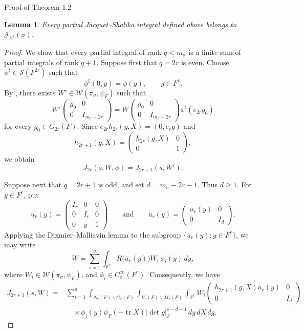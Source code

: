 \documentclass[12pt,reqno]{amsart}
\numberwithin{equation}{section}%
\numberwithin{equation}{subsection}
\newtheorem{lemma}[equation]{Lemma}
\theoremstyle{definition}
\theoremstyle{remark}
\begin{document}
\begin{section}{Proof of Theorem 1.2}
\begin{lemma}
\label{lem:partial-jacquet-shalika-integrals}
Every partial Jacquet--Shalika integral defined above belongs to $\mathcal{J}_{\wedge^2}(\sigma)$.
\end{lemma}

\begin{proof}
We show that every partial integral of rank $q<m_\sigma$ is a finite sum of partial integrals of rank $q+1$. Suppose first that $q=2r$ is even. Choose $\phi^\sharp\in\mathcal{S}(F^{2r})$ such that
\[
  \phi^\sharp(0,y)=\phi(y), \qquad y\in F^r.
\]
By \cite[Proposition~6.1]{Jac2009}, there exists $W'\in\mathcal{W}(\pi_\sigma,\psi_F)$ such that
\[
  W' \begin{pmatrix} g_0&0\\ 0&I_{m_\sigma-2r} \end{pmatrix} = W \begin{pmatrix} g_0&0\\ 0&I_{m_\sigma-2r} \end{pmatrix} \phi^\sharp(e_{2r}g_0)
\]
for every $g_0\in G_{2r}(F)$. Since $e_{2r}h_{2r}(g,X)=(0,e_rg)$ and
\[
  h_{2r+1}(g,X) = \begin{pmatrix} h_{2r}(g,X)&0\\ 0&1 \end{pmatrix},
\]
we obtain
\[
  J_{2r}(s,W,\phi) = J_{2r+1}(s,W').
\]

Suppose next that $q=2r+1$ is odd, and set $d=m_\sigma-2r-1$. Thus $d\geq1$. For $y\in F^r$, put
\[
  u_r(y) = \begin{pmatrix} I_r&0&0\\ 0&I_r&0\\ 0&y&1 \end{pmatrix} \qquad\text{and}\qquad \overline{u}_r(y) = \begin{pmatrix} u_r(y)&0\\ 0&I_{d} \end{pmatrix}.
\]
Applying the Dixmier--Malliavin lemma \cite[Lemma~6.1]{Jac2009} to the subgroup $\{\overline{u}_r(y) : y \in F^r\}$, we may write
\[
  W = \sum_{i=1}^a \int_{F^r} R\bigl(\overline{u}_r(y)\bigr) W_i \, \phi_i(y) \, dy,
\]
where $W_i \in \mathcal{W}(\pi_\sigma, \psi_F)$, and $\phi_i \in C_c^\infty(F^r)$. Consequently, we have
\[
  \begin{aligned}
    J_{2r+1}(s,W) ={}& \sum_{i=1}^a \int_{N_r(F)\backslash G_r(F)} \int_{V_r(F)\backslash M_r(F)} \int_{F^r} W_i \begin{pmatrix} h_{2r+1}(g,X) u_r(y) & 0 \\ 0 & I_{d} \end{pmatrix} \\
    &\quad \times \phi_i(y) \psi_F(-\operatorname{tr} X) |\det g|_F^{s-d-1} \, dy \, dX \, dg.
  \end{aligned}
\]


\end{proof}
\end{section}
\end{document}
